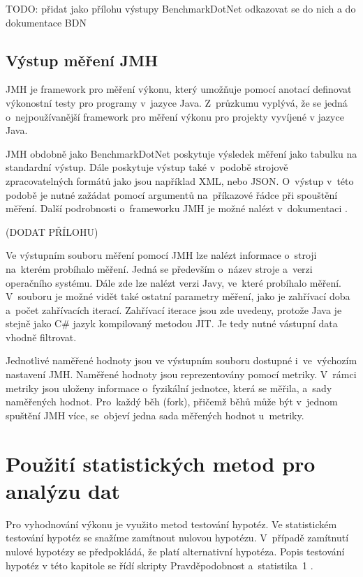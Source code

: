 TODO: přidat jako přílohu výstupy BenchmarkDotNet odkazovat se do nich a do dokumentace BDN

\subsection{Výstup měření JMH}

JMH je framework pro měření výkonu, který umožňuje pomocí anotací definovat výkonostní testy
pro programy v~jazyce Java. Z~průzkumu \cite[]{unitTestingPerformanceSurvey} vyplývá, že se jedná o~nejpoužívanější framework
pro měření výkonu pro projekty vyvíjené v jazyce Java.

JMH obdobně jako BenchmarkDotNet poskytuje výsledek měření jako tabulku na standardní výstup.
Dále poskytuje výstup také v~podobě strojově zpracovatelných formátů jako jsou například XML,
nebo JSON. O~výstup v~této podobě je nutné zažádat pomocí argumentů na~příkazové řádce při
spouštění měření. Další podrobnosti o~frameworku JMH je možné nalézt v~dokumentaci \cite[]{jmh}.

(DODAT PŘÍLOHU)

Ve výstupním souboru měření pomocí JMH lze nalézt informace o~stroji na~kterém probíhalo měření.
Jedná se především o~název stroje a~verzi operačního systému. Dále zde lze nalézt verzi Javy,
ve~které probíhalo měření. V~souboru je možné vidět také ostatní parametry měření, jako je
zahřívací doba a~počet zahřívacích iterací. Zahřívací iterace jsou zde uvedeny, protože Java
je stejně jako C\# jazyk kompilovaný metodou JIT. Je tedy nutné vástupní data vhodně filtrovat.

Jednotlivé naměřené hodnoty jsou ve výstupním souboru dostupné i~ve~výchozím nastavení JMH.
Naměřené hodnoty jsou reprezentovány pomocí metriky. V~rámci metriky jsou uloženy informace
o~fyzikální jednotce, která se měřila, a~sady naměřených hodnot. Pro~každý běh (fork), přičemž běhů
může být v~jednom spuštění JMH více, se~objeví jedna sada měřených hodnot u~metriky.

\section{Použití statistických metod pro analýzu dat}

Pro vyhodnování výkonu je využito metod testování hypotéz. Ve statistickém testování
hypotéz se snažíme zamítnout nulovou hypotézu. V~případě zamítnutí nulové hypotézy
se předpokládá, že platí alternativní hypotéza. Popis testování hypotéz v této kapitole
se řídí skripty Pravděpodobnost a~statistika~1 \cite[]{samal_nmai059_nodate}.

